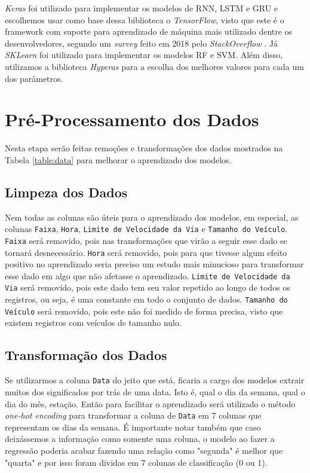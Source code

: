 \textit{Keras} foi utilizado para implementar os modelos de \acrshort{RNN}, \acrshort{LSTM} e \acrshort{GRU} e escolhemos usar como base dessa biblioteca o \textit{TensorFlow}, visto que este é o framework com suporte para aprendizado de máquina mais utilizado dentre os desenvolvedores, segundo um \textit{survey} feito em 2018 pelo \textit{StackOverflow} \cite{stack_2018}. Já \textit{SKLearn} foi utilizado para implementar os modelos \acrshort{RF} e \acrshort{SVM}. Além disso, utilizamos a biblioteca \textit {Hyperas} para a escolha dos melhores valores para cada um dos parâmetros.

\section{Pré-Processamento dos Dados}

Nesta etapa serão feitas remoções e transformações dos dados mostrados na Tabela \ref{table:data} para melhorar o aprendizado dos modelos.

\subsection{Limpeza dos Dados}

Nem todas as colunas são úteis para o aprendizado dos modelos, em especial, as colunas \texttt{Faixa}, \texttt{Hora}, \texttt{Limite de Velocidade da Via} e \texttt{Tamanho do Veículo}. \texttt{Faixa} será removido, pois nas transformações que virão a seguir esse dado se tornará desnecessário. \texttt{Hora} será removido, pois para que tivesse algum efeito positivo no aprendizado  seria preciso um estudo mais minucioso para transformar esse dado em algo que não afetasse o aprendizado. \texttt{Limite de Velocidade da Via} será removido, pois este dado tem seu valor repetido ao longo de todos os registros, ou seja, é uma constante em todo o conjunto de dados. \texttt{Tamanho do Veículo} será removido, pois este não foi medido de forma precisa, visto que existem registros com veículos de tamanho nulo.


\subsection{Transformação dos Dados}

Se utilizarmos a coluna \texttt{Data} do jeito que está, ficaria a cargo dos modelos extrair muitos dos significados por trás de uma data. Isto é, qual o dia da semana, qual o dia do mês, estação. Então para facilitar o aprendizado será utilizado o método \textit{one-hot encoding} para transformar a coluna de \texttt{Data} em 7 colunas que representam os dias da semana. É importante notar também que caso deixássemos a informação como somente uma coluna, o modelo ao fazer a regressão poderia acabar fazendo uma relação como "segunda" é melhor que "quarta" e por isso foram dividas em 7 colunas de classificação (0 ou 1).

